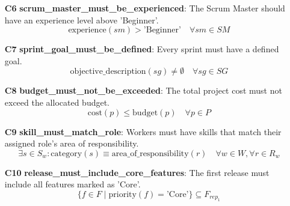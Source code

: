 \documentclass[11pt]{article}
\begin{document}
\begin{itemize}
    \item[\textbf{C6}] \textbf{scrum\_master\_must\_be\_experienced}: The Scrum Master should have an experience level above 'Beginner'.
    \[ \text{experience}(sm) > \text{'Beginner'} \quad \forall sm \in SM \]

    \item[\textbf{C7}] \textbf{sprint\_goal\_must\_be\_defined}: Every sprint must have a defined goal.
    \[ \text{objective\_description}(sg) \neq \emptyset \quad \forall sg \in SG \]

    \item[\textbf{C8}] \textbf{budget\_must\_not\_be\_exceeded}: The total project cost must not exceed the allocated budget.
    \[ \text{cost}(p) \leq \text{budget}(p) \quad \forall p \in P \]

    \item[\textbf{C9}] \textbf{skill\_must\_match\_role}: Workers must have skills that match their assigned role's area of responsibility.
    \[ \exists s \in S_w : \text{category}(s) \equiv \text{area\_of\_responsibility}(r) \quad \forall w \in W, \forall r \in R_w \]

    \item[\textbf{C10}] \textbf{release\_must\_include\_core\_features}: The first release must include all features marked as 'Core'.
    \[ \{ f \in F \mid \text{priority}(f) = \text{'Core'} \} \subseteq F_{rep_1} \]
\end{itemize}
\end{document}
